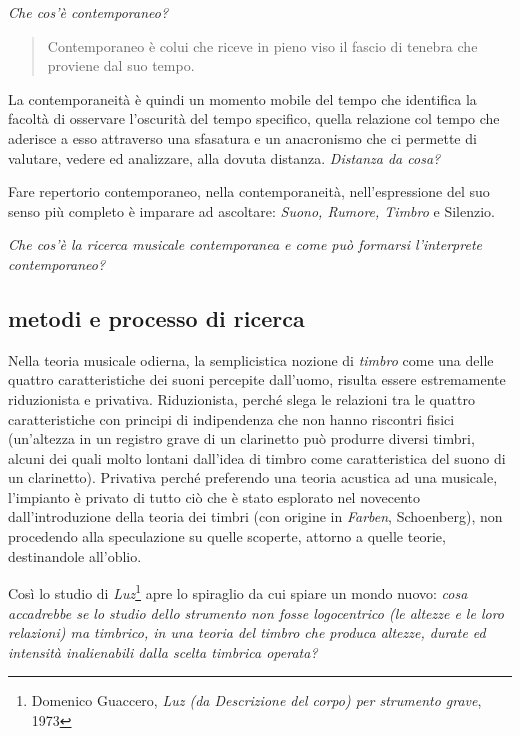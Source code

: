 \documentclass{gs-adonis}
\begin{document}
\emph{Che cos'è contemporaneo?}

\begin{quote}
  Contemporaneo è colui che riceve in pieno viso il fascio di tenebra che
  proviene dal suo tempo. \cite{agamben2008che}
\end{quote}

La contemporaneità è quindi un momento mobile del tempo che identifica la
facoltà di osservare l’oscurità del tempo specifico, quella relazione col
tempo che aderisce a esso attraverso una sfasatura e un anacronismo che ci
permette di valutare, vedere ed analizzare, alla dovuta distanza.
\emph{Distanza da cosa?}

Fare repertorio contemporaneo, nella contemporaneità, nell’espressione del suo
senso più completo è imparare ad ascoltare: \emph{Suono, Rumore, Timbro} e Silenzio.

\emph{Che cos'è la ricerca musicale contemporanea e come può formarsi l'interprete contemporaneo?}
\subsection{metodi e processo di ricerca}%

Nella teoria musicale odierna, la semplicistica nozione di \emph{timbro} come
una delle quattro caratteristiche dei suoni percepite dall'uomo, risulta essere
estremamente riduzionista e privativa. Riduzionista, perché slega le relazioni
tra le quattro caratteristiche con principi di indipendenza che non hanno
riscontri fisici (un'altezza in un registro grave di un clarinetto può produrre
diversi timbri, alcuni dei quali molto lontani dall'idea di timbro come
caratteristica del suono di un clarinetto). Privativa perché preferendo una
teoria acustica ad una musicale, l'impianto è privato di tutto ciò che è stato
esplorato nel novecento dall'introduzione della teoria dei timbri (con origine
in \emph{Farben}, Schoenberg), non procedendo alla speculazione su quelle
scoperte, attorno a quelle teorie, destinandole all'oblio.

Così lo studio di \emph{Luz}\footnote{%
Domenico Guaccero, \emph{Luz (da Descrizione del corpo) per strumento grave}, 1973
} apre lo spiraglio da cui spiare un mondo nuovo: \emph{cosa accadrebbe se lo
studio dello strumento non fosse logocentrico (le altezze e le loro relazioni)
ma timbrico, in una teoria del timbro che produca altezze, durate ed intensità
inalienabili dalla scelta timbrica operata?}
\end{document}
